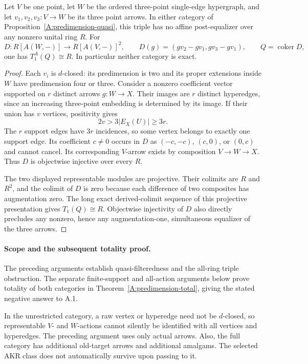 \begin{proposition}
\label{A:predimension-triple}
Let $V$ be one point, let $W$ be the ordered three-point single-edge
hypergraph, and let $v_1,v_2,v_3:V\to W$ be its three point arrows.
In either category of Proposition~\ref{A:predimension-quasi}, this
triple has no affine post-equalizer over any nonzero unital ring $R$.
For
\[
 D:R[A(W,-)]\longrightarrow R[A(V,-)]^2,
 \qquad D(g)=(gv_2-gv_1,gv_3-gv_1),
 \qquad Q=\operatorname{coker}D,
\]
one has $T_1^A(Q)\cong R$. In particular neither category is exact.
\end{proposition}
\begin{proof}
Each $v_i$ is $d$-closed: its predimension is two and its proper
extensions inside $W$ have predimension four or three. Consider a
nonzero coefficient vector supported on $r$ distinct arrows $g:W\to X$.
Their images are $r$ distinct hyperedges, since an increasing
three-point embedding is determined by its image. If their union has
$v$ vertices, positivity gives
\[
 2v>3|E_X(U)|\geq3r.
\]
The $r$ support edges have $3r$ incidences, so some vertex belongs
to exactly one support edge. Its coefficient $c\neq0$ occurs in
$D$ as $(-c,-c)$, $(c,0)$, or $(0,c)$ and cannot cancel. Its
corresponding $V$-arrow exists by composition $V\to W\to X$.
Thus $D$ is objectwise injective over every $R$.

The two displayed representable modules are projective. Their
colimits are $R$ and $R^2$, and the colimit of $D$ is zero because
each difference of two composites has augmentation zero. The long
exact derived-colimit sequence of this projective presentation gives
$T_1(Q)\cong R$. Objectwise injectivity of $D$ also directly
precludes any nonzero, hence any augmentation-one, simultaneous
equalizer of the three arrows.
\end{proof}

\paragraph{Scope and the subsequent totality proof.}
The preceding arguments establish quasi-filteredness and the
all-ring triple obstruction. The separate finite-support and
all-action arguments below prove totality of both categories in
Theorem~\ref{A:predimension-total}, giving the stated negative
answer to A.1.

In the unrestricted category, a raw vertex or hyperedge need not
be $d$-closed, so representable $V$- and $W$-actions cannot silently
be identified with all vertices and hyperedges. The preceding
argument uses only actual arrows. Also, the full category has
additional old-target arrows and additional amalgams. The selected
AKR class does not automatically survive upon passing to it.

